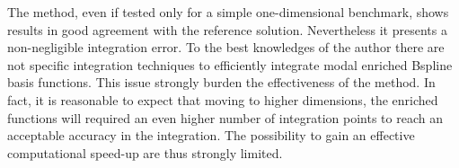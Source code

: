 \documentclass[3p]{article}
\begin{document}
The method, even if tested only for a simple one-dimensional benchmark, shows results in good agreement with the reference solution. Nevertheless it presents a non-negligible integration error.
To the best knowledges of the author there are not specific integration techniques to efficiently integrate modal enriched Bspline basis functions. This issue strongly burden the effectiveness of the method. In fact, it is reasonable to expect that moving to higher dimensions, the enriched functions will required an even higher number of integration points to reach an acceptable accuracy in the integration. The possibility to gain an effective computational speed-up are thus strongly limited.



\end{document}
